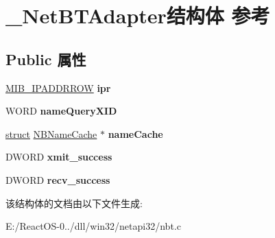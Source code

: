 \hypertarget{struct___net_b_t_adapter}{}\section{\+\_\+\+Net\+B\+T\+Adapter结构体 参考}
\label{struct___net_b_t_adapter}
\subsection*{Public 属性}
\begin{DoxyCompactItemize}
\item 
\mbox{\label{struct___net_b_t_adapter_a750c25d8192a1c669936645526af1022}} 
\hyperlink{struct___m_i_b___i_p_a_d_d_r_r_o_w}{M\+I\+B\+\_\+\+I\+P\+A\+D\+D\+R\+R\+OW} {\bfseries ipr}
\item 
\mbox{\label{struct___net_b_t_adapter_a623e7631b20a0b0f87cc8df601cbbeda}} 
W\+O\+RD {\bfseries name\+Query\+X\+ID}
\item 
\mbox{\label{struct___net_b_t_adapter_ad661b6be6425ddf3fca008d7330c384f}} 
\hyperlink{interfacestruct}{struct} \hyperlink{struct_n_b_name_cache}{N\+B\+Name\+Cache} $\ast$ {\bfseries name\+Cache}
\item 
\mbox{\label{struct___net_b_t_adapter_a2017407c23e912cda8098280eb8d02ad}} 
D\+W\+O\+RD {\bfseries xmit\+\_\+success}
\item 
\mbox{\label{struct___net_b_t_adapter_af64ee77b916463fb9d3e2c89e13a0bfd}} 
D\+W\+O\+RD {\bfseries recv\+\_\+success}
\end{DoxyCompactItemize}


该结构体的文档由以下文件生成\+:\begin{DoxyCompactItemize}
\item 
E\+:/\+React\+O\+S-\/0../dll/win32/netapi32/nbt.\+c\end{DoxyCompactItemize}
